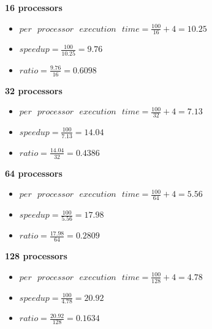 \documentclass[12pt, a4paper]{article}
\begin{document}
\begin{itemize}[font=\bfseries]
{\bf 16 processors}
\begin{itemize}
\item $per\mbox{ }processor\mbox{ }execution\mbox{ }time = \frac{100}{16} + 4 = 10.25$\\
\item $speedup = \frac{100}{10.25} = 9.76$ \\
\item $ratio = \frac{9.76}{16} = 0.6098$ \\
\end{itemize}

{\bf 32 processors}
\begin{itemize}
\item $per\mbox{ }processor\mbox{ }execution\mbox{ }time = \frac{100}{32} + 4 = 7.13$ \\
\item $speedup = \frac{100}{7.13} = 14.04$ \\
\item $ratio = \frac{14.04}{32} = 0.4386$ \\
\end{itemize}

{\bf 64 processors}
\begin{itemize}
\item $per\mbox{ }processor\mbox{ }execution\mbox{ }time = \frac{100}{64} + 4 = 5.56$ \\
\item $speedup = \frac{100}{5.56} = 17.98$ \\
\item $ratio = \frac{17.98}{64} = 0.2809$ \\
\end{itemize}

{\bf 128 processors}
\begin{itemize}
\item $per\mbox{ }processor\mbox{ }execution\mbox{ }time = \frac{100}{128} + 4 = 4.78$ \\
\item $speedup = \frac{100}{4.78} = 20.92$ \\
\item $ratio = \frac{20.92}{128} = 0.1634$ \\
\end{itemize}

\end{itemize}
\end{document}
